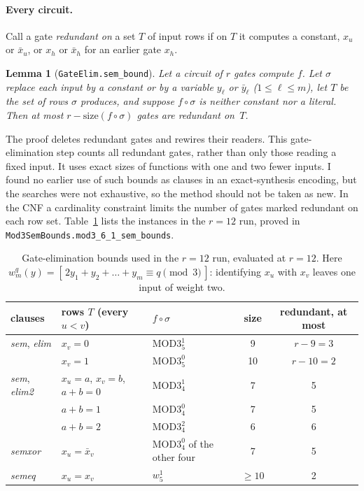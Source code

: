 \documentclass[11pt]{article}
\newtheorem{lemma}{Lemma}
\newcommand{\MOD}[2]{\mathrm{MOD3}^{#1}_{#2}}
\newcommand{\size}{\mathrm{size}}
\newcommand{\lean}[1]{\texttt{#1}}
\begin{document}
\paragraph{Every circuit.} Call a gate \emph{redundant on} a set $T$ of input rows if on $T$ it computes a
constant, $x_u$ or $\bar x_u$, or $x_h$ or $\bar x_h$ for an earlier gate $x_h$.

\begin{lemma}[\lean{GateElim.sem\_bound}]\label{lem:sem}
Let a circuit of $r$ gates compute $f$. Let $\sigma$ replace each input by a constant or by a variable
$y_\ell$ or $\bar y_\ell$ ($1\le\ell\le m$), let $T$ be the set of rows $\sigma$ produces, and suppose
$f\circ\sigma$ is neither constant nor a literal. Then at most $r-\size(f\circ\sigma)$ gates are redundant
on~$T$.
\end{lemma}

The proof deletes redundant gates and rewires their readers. This gate-elimination step counts
all redundant gates, rather than only those reading a fixed input. It uses exact sizes of functions
with one and two fewer inputs. I found no earlier use of such bounds as clauses in an exact-synthesis encoding, but the
searches were not exhaustive, so the method should not be taken as new. In the CNF a cardinality constraint
limits the number of gates marked redundant on each row set. Table~\ref{tab:bounds} lists the instances in the $r=12$ run,
proved in \lean{Mod3SemBounds.mod3\_6\_1\_sem\_bounds}.

\begin{table}[h]
\centering\small
\begin{tabular}{l l l c c}
\toprule
clauses & rows $T$ (every $u<v$) & $f\circ\sigma$ & size & redundant, at most\\
\midrule
\emph{sem}, \emph{elim} & $x_v=0$ & $\MOD{1}{5}$ & 9 & $r-9=3$\\
 & $x_v=1$ & $\MOD{0}{5}$ & 10 & $r-10=2$\\
\emph{sem}, \emph{elim2} & $x_u=a$, $x_v=b$, $a+b=0$ & $\MOD{1}{4}$ & 7 & 5\\
 & \hphantom{$x_u=a$, $x_v=b$,} $a+b=1$ & $\MOD{0}{4}$ & 7 & 5\\
 & \hphantom{$x_u=a$, $x_v=b$,} $a+b=2$ & $\MOD{2}{4}$ & 6 & 6\\
\emph{semxor} & $x_u=\bar x_v$ & $\MOD{0}{4}$ of the other four & 7 & 5\\
\emph{semeq} & $x_u=x_v$ & $w^1_5$ & $\ge10$ & 2\\
\bottomrule
\end{tabular}
\caption{Gate-elimination bounds used in the $r=12$ run, evaluated at $r=12$. Here
$w^q_m(y)=[\,2y_1+y_2+\dots+y_m\equiv q \pmod 3\,]$: identifying $x_u$ with $x_v$ leaves one input of weight
two.}\label{tab:bounds}
\end{table}
\end{document}

